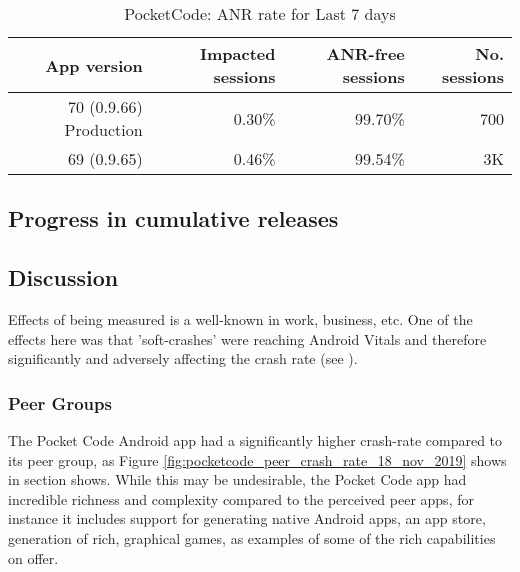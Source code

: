 \begin{table}[htbp!]
    \centering
    \footnotesize
    \begin{tabular}{r|r|r|r}
      App version  &Impacted sessions &ANR-free sessions &No. sessions \\
      \hline
      70 (0.9.66) Production &0.30\% &99.70\%	&~700 \\
      69 (0.9.65)            &0.46\% &99.54\%	&~3K  \\
    \end{tabular}
    \caption{PocketCode: ANR rate for Last 7 days}
    \label{tab:ANR_rate_24_to_29_Nov_2019}
\end{table}

\subsection{Progress in cumulative releases}



\subsection{Discussion}
Effects of being measured is a well-known in work, business, etc. One of the effects here was that 'soft-crashes' were reaching Android Vitals and therefore significantly and adversely affecting the crash rate (see \cite{CATDROID-426-JIRA}).

\subsubsection{Peer Groups}
The Pocket Code Android app had a significantly higher crash-rate compared to its peer group, as Figure \ref{fig:pocketcode_peer_crash_rate_18_nov_2019} shows in section \href{android-vitals-peer-groups}{\emph{}} shows. While this may be undesirable, the Pocket Code app had incredible richness and complexity compared to the perceived peer apps, for instance it includes support for generating native Android apps, an app store, generation of rich, graphical games, as examples of some of the rich capabilities on offer.


